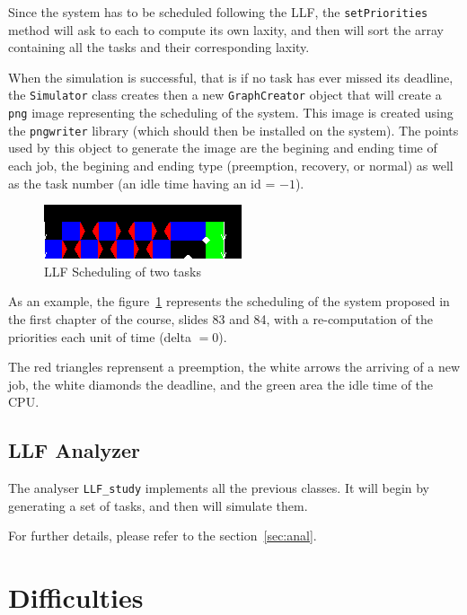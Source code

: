 \documentclass[a4paper,11pt]{article}
\begin{document}
    Since the system has to be scheduled following the LLF, the \texttt{setPriorities} method will ask to each to compute its own laxity, and then will sort the array containing all the tasks and their corresponding laxity.
     
    When the simulation is successful, that is if no task has ever missed its deadline, the \texttt{Simulator} class creates then a new \texttt{GraphCreator} object that will create a \texttt{png} image representing the scheduling of the system.
    This image is created using the \texttt{pngwriter} library (which should then be installed on the system).
    The points used by this object to generate the image are the begining and ending time of each job, the begining and ending type (preemption, recovery, or normal) as well as the task number (an idle time having an id = $-1$).
     
    \begin{figure}
    \centering
    \includegraphics{tasksEDFvsLLF}
    \caption{LLF Scheduling of two tasks}
    \label{fig:tasksEDFvsLLF}
    \end{figure}
     
    As an example, the figure~\ref{fig:tasksEDFvsLLF} represents the scheduling of the system proposed in the first chapter of the course,
    slides 83 and 84, with a re-computation of the priorities each unit of time (delta $= 0$).
     
    The red triangles reprensent a preemption, the white arrows the arriving of a new job, the white diamonds the deadline, and the green area the idle time of the CPU.
     
    \subsection{LLF Analyzer}
    The analyser \texttt{LLF\_study} implements all the previous classes. It will begin by generating a set of tasks, and then will simulate them.
     
    For further details, please refer to the section~\ref{sec:anal}.
     
     
     
     
    \section{Difficulties}
\end{document}
